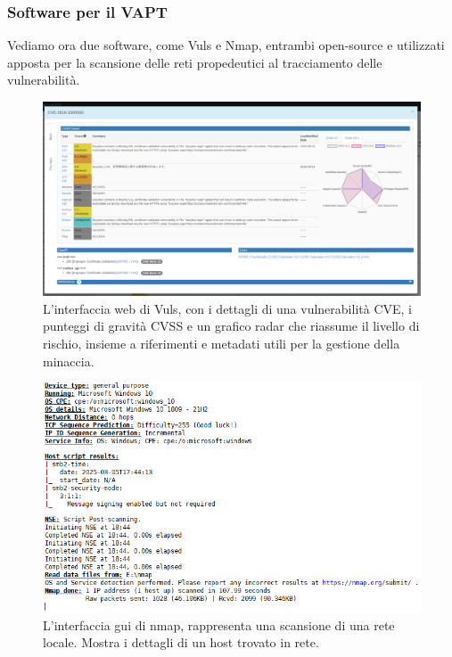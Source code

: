         \subsubsection{Software per il VAPT}
        Vediamo ora due software, come Vuls e Nmap, entrambi open-source e utilizzati apposta per la scansione delle reti propedeutici al tracciamento delle vulnerabilità.
        \begin{figure}[H]
            \centering
            \includegraphics[width=1.0\textwidth]{Immagini/vuls_main_page.png}
            \caption{L'interfaccia web di Vuls\protect\footnotemark, con i dettagli di una vulnerabilità CVE, i punteggi di gravità CVSS e un grafico radar che riassume il livello di rischio, insieme a riferimenti e metadati utili per la gestione della minaccia.}
            \label{fig:vuls_main_page}
        \end{figure}

        \begin{figure}[H]
            \centering
            \includegraphics[width=1.0\textwidth]{Immagini/nmap_2.PNG}
            \caption{L'interfaccia gui di nmap\protect\footnotemark, rappresenta una scansione di una rete locale. Mostra i dettagli di un host trovato in rete.}
            \label{fig:nmap_scan_host}
        \end{figure}
        
